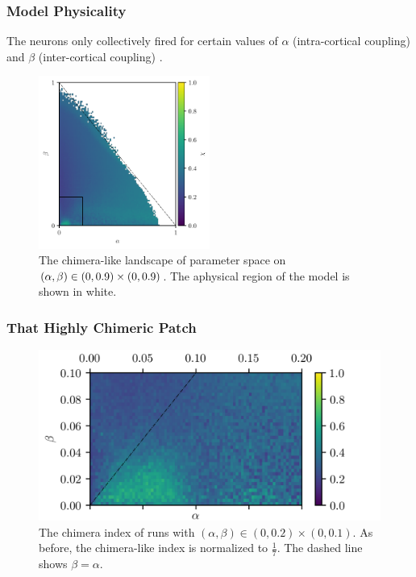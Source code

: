 \documentclass[hyperref={hidelinks}]{beamer}
\newcommand*{\hra}{\alpha}
\newcommand*{\hrb}{\beta}
\begin{document}
\begin{frame}
  \frametitle{Model Physicality}
  The neurons only collectively fired for certain values of $\hra$ (intra-cortical coupling) and $\hrb$ (inter-cortical coupling) \cite{Mitchell2019}.
  \begin{figure}[ht]
    \centering
    \includegraphics[width=0.5\textwidth]{figure/aphysical_chimera}
    \caption[Chimera-like index landscape]{
      The chimera-like landscape of parameter space on $\pqty{\hra, \hrb} \in \pqty{0, 0.9} \times \pqty{0, 0.9}$.
      The aphysical region of the model is shown in white.
    }
    \label{fig:aphysical_chimera}
  \end{figure}

\end{frame}

\begin{frame}
  \frametitle{That Highly Chimeric Patch}
  \begin{figure}[ht]
    \centering
    \includegraphics{figure/zoom_chimera}
    \caption[Zoomed landscape]{The chimera index of runs with $(\hra, \hrb) \in (0, 0.2) \times (0, 0.1)$.
      As before, the chimera-like index is normalized to $\frac{1}{7}$.
      The dashed line shows $\beta = \alpha$.
    }
    \label{fig:zoom_chimera}

  \end{figure}

\end{frame}
\end{document}
